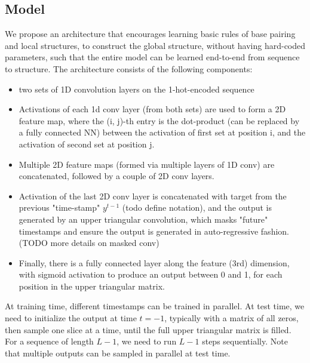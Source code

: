 \documentclass{article}
\begin{document}


\subsection{Model}

We propose an architecture that encourages learning
basic rules of base pairing and local structures, to construct the global structure,
without having hard-coded parameters,
such that the entire model can be learned end-to-end from sequence to structure.
The architecture consists of the following components:


\begin{itemize}

    \item two sets of 1D convolution layers on the 1-hot-encoded sequence

    \item Activations of each 1d conv layer (from both sets) are used to form a 2D feature map,
where the (i, j)-th entry is the dot-product (can be replaced by a fully connected NN) between the
activation of first set at position i, and the activation of second set at position j.

    \item Multiple 2D feature maps (formed via multiple layers of 1D conv) are concatenated,
followed by a couple of 2D conv layers.

    \item  Activation of the last 2D conv layer is concatenated with target from the previous "time-stamp" $y^{t-1}$ (todo define notation),
and the output is generated by an upper triangular convolution,
which masks "future" timestamps and ensure the output is generated in auto-regressive fashion. (TODO more details on masked conv)

    \item Finally, there is a fully connected layer along the feature (3rd) dimension,
   with sigmoid activation to produce an output between 0 and 1,
    for each position in the upper triangular matrix.

\end{itemize}

At training time, different timestamps can be trained in parallel.
At test time, we need to initialize the output at time $t=-1$, typically with a matrix of all zeros,
then sample one slice at a time, until the full upper triangular matrix is filled.
For a sequence of length $L-1$, we need to run $L-1$ steps sequentially.
Note that multiple outputs can be sampled in parallel at test time.
\end{document}
